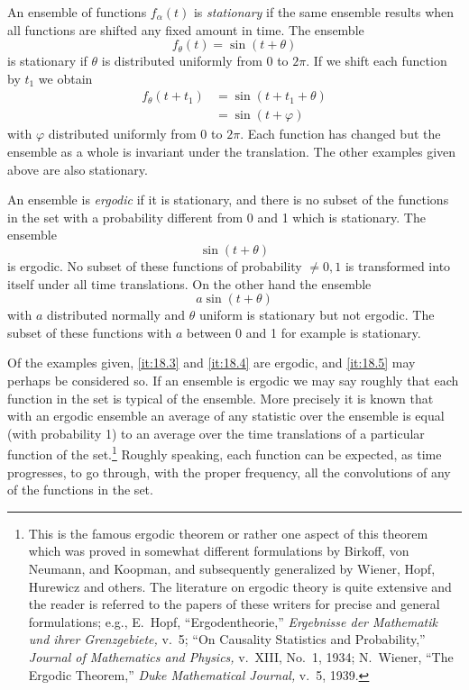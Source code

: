 An ensemble of functions $f_\alpha(t)$ is \emph{stationary} if the same
ensemble results when all functions are shifted any fixed amount in time.
The ensemble
$$
f_\theta(t)=\sin(t+\theta)
$$
is stationary if $\theta$ is distributed uniformly from $0$ to $2\pi$.  If
we shift each function by $t_1$ we obtain
\begin{align*}
f_\theta(t+t_1)&=\sin(t+t_1+\theta)\\
	&=\sin(t+\varphi)
\end{align*}
with $\varphi$ distributed uniformly from $0$ to $2\pi$.  Each function has
changed but the ensemble as a whole is invariant under the translation.
The other examples given above are also stationary.

An ensemble is \emph{ergodic} if it is stationary, and there is no subset
of the functions in the set with a probability different from 0 and 1 which
is stationary.  The ensemble
$$
\sin(t+\theta)
$$
is ergodic.  No subset of these functions of probability $\neq0,1$ is
transformed into itself under all time translations.  On the other hand the
ensemble
$$
a\sin(t+\theta)
$$
with $a$ distributed normally and $\theta$ uniform is stationary but not
ergodic.  The subset of these functions with $a$ between 0 and
1 for example is stationary.

Of the examples given, \ref{it:18.3} and \ref{it:18.4} are ergodic, and
\ref{it:18.5} may perhaps be considered so.  If an ensemble is ergodic we
may say roughly that each function in the set is typical of the ensemble.
More precisely it is known that with an ergodic ensemble an average of any
statistic over the ensemble is equal (with probability 1) to an average
over the time translations of a particular function of the
set.\footnote{This is the famous ergodic theorem or rather one aspect of
this theorem which was proved in somewhat different formulations by Birkoff,
von Neumann, and Koopman, and subsequently generalized by Wiener,
Hopf, Hurewicz and others.  The literature on ergodic theory is quite
extensive and the reader is referred to the papers of these writers for
precise and general formulations; e.g., E.~Hopf, ``Ergodentheorie,'' {\it
Ergebnisse der Mathematik und ihrer Grenzgebiete,} v.~5; ``On Causality
Statistics and Probability,'' {\it Journal of Mathematics and Physics,}
v.~XIII, No.~1, 1934; N.~Wiener, ``The Ergodic Theorem,'' {\it Duke
Mathematical Journal,} v.~5, 1939.} Roughly speaking, each function can
be expected, as time progresses, to go through, with the proper frequency,
all the convolutions of any of the functions in the set.

